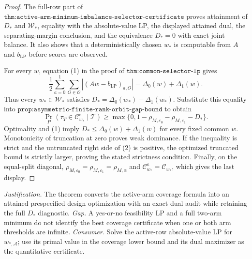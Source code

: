 \documentclass{article}
\begin{document}
\begin{proof}
The full-row part of \(\texttt{thm:active-arm-minimum-imbalance-selector-certificate}\) proves attainment of \(D_*\) and \(\mathcal W_*\), equality with the absolute-value LP, the displayed attained dual, the separating-margin conclusion, and the equivalence \(D_*=0\) with exact joint balance. It also shows that a deterministically chosen \(w_*\) is computable from \(A\) and \(b_{\mathrm{LP}}\) before scores are observed.

For every \(w\), equation (1) in the proof of \(\texttt{thm:common-selector-lp}\) gives
\[
\frac12\sum_{a=0}^1\sum_{O\in\mathcal O}|(Aw-b_{\mathrm{LP}})_{a,O}|=\Delta_0(w)+\Delta_1(w).
\tag{1}
\]
Thus every \(w_*\in\mathcal W_*\) satisfies \(D_*=\Delta_0(w_*)+\Delta_1(w_*)\). Substitute this equality into \(\texttt{prop:asymmetric-finite-rank-orbit-gap-bound}\) to obtain
\[
\Pr_P(\tau_T\in\mathcal C^{\boldsymbol\varepsilon}_{w_*}\mid\mathcal T)\ge\max\{0,1-\rho_{M,\varepsilon_0}-\rho_{M,\varepsilon_1}-D_*\}.
\tag{2}
\]
Optimality and (1) imply \(D_*\le\Delta_0(w)+\Delta_1(w)\) for every fixed common \(w\). Monotonicity of truncation at zero proves weak dominance. If the inequality is strict and the untruncated right side of (2) is positive, the optimized truncated bound is strictly larger, proving the stated strictness condition. Finally, on the equal-split diagonal, \(\rho_{M,\varepsilon_0}=\rho_{M,\varepsilon_1}=\rho_{M,\alpha}\) and \(\mathcal C^{\boldsymbol\varepsilon}_{w_*}=\mathcal C_{w_*}\), which gives the last display.
\end{proof}
\par\smallskip\noindent \textit{Justification.} The theorem converts the active-arm coverage formula into an attained prespecified design optimization with an exact dual audit while retaining the full \(D_*\) diagnostic. \textit{Gap.} A yes-or-no feasibility LP and a full two-arm minimum do not identify the best coverage certificate when one or both arm thresholds are infinite. \textit{Consumer.} Solve the active-row absolute-value LP for \(w_{*,\mathcal A}\); use its primal value in the coverage lower bound and its dual maximizer as the quantitative certificate.
\end{document}
